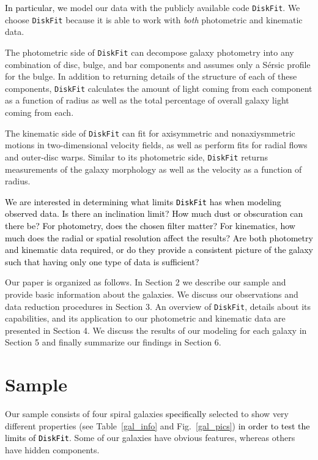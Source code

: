 \documentclass[a4paper,fleqn,usenatbib]{mnras}
\newcommand{\authorfix}{\textcolor{black}}
\begin{document}
\authorfix{In particular, w}e model our data with the publicly available code \texttt{DiskFit}. We choose \texttt{DiskFit} because it is able to work with \textit{both} photometric and kinematic data.

The photometric side of \texttt{DiskFit} can decompose galaxy photometry into any combination of disc, bulge, and bar components and assumes only a S\'{e}rsic profile for the bulge.  In addition to returning details of the structure of each of these components, \texttt{DiskFit} calculates the amount of light coming from each component as a function of radius as well as the total percentage of overall galaxy light coming from each.

The kinematic side of \texttt{DiskFit} can fit for axisymmetric and nonaxiysmmetric motions in two-dimensional velocity fields, as well as perform fits for radial flows and outer-disc warps. Similar to its photometric side, \texttt{DiskFit} returns measurements of the galaxy morphology as well as the velocity as a function of radius.

\authorfix{We are interested in determining what limits \texttt{DiskFit} has when modeling observed data. Is there an inclination limit? How much dust or obscuration can there be? For photometry, does the chosen filter matter? For kinematics, how much does the radial or spatial resolution affect the results? Are both photometry and kinematic data required, or do they provide a consistent picture of the galaxy such that having only one type of data is sufficient?}

Our paper is organized as follows. In Section 2 we describe our sample and provide basic information about the galaxies. We discuss our observations and data reduction procedures in Section 3. An overview of \texttt{DiskFit}, details about its capabilities, and its application to our photometric and kinematic data are presented in Section 4. We discuss the results of our modeling for each galaxy in Section 5 and finally summarize our findings in Section 6.

\section{Sample}
\label{sec:sample}

Our sample consists of four spiral galaxies \authorfix{specifically} selected to show very different properties (see Table~\ref{gal_info} and Fig.~\ref{gal_pics}) \authorfix{in order to test the limits of \texttt{DiskFit}}. Some of our galaxies have obvious features, whereas others have hidden components. 
\end{document}
